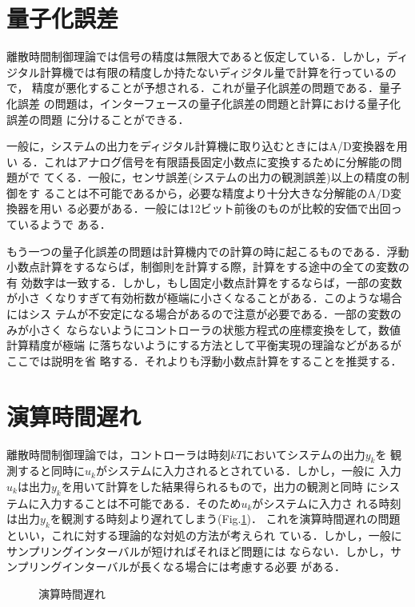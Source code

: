 \section{量子化誤差}
離散時間制御理論では信号の精度は無限大であると仮定している．しかし，ディ
ジタル計算機では有限の精度しか持たないディジタル量で計算を行っているので，
精度が悪化することが予想される．これが量子化誤差の問題である．量子化誤差
の問題は，インターフェースの量子化誤差の問題と計算における量子化誤差の問題
に分けることができる．

一般に，システムの出力をディジタル計算機に取り込むときにはA/D変換器を用い
る．これはアナログ信号を有限語長固定小数点に変換するために分解能の問題がで
てくる．一般に，センサ誤差(システムの出力の観測誤差)以上の精度の制御をす
ることは不可能であるから，必要な精度より十分大きな分解能のA/D変換器を用い
る必要がある．一般には12ビット前後のものが比較的安価で出回っているようで
ある．

もう一つの量子化誤差の問題は計算機内での計算の時に起こるものである．浮動
小数点計算をするならば，制御則を計算する際，計算をする途中の全ての変数の有
効数字は一致する．しかし，もし固定小数点計算をするならば，一部の変数が小さ
くなりすぎて有効桁数が極端に小さくなることがある．このような場合にはシス
テムが不安定になる場合があるので注意が必要である．一部の変数のみが小さく
ならないようにコントローラの状態方程式の座標変換をして，数値計算精度が極端
に落ちないようにする方法として平衡実現の理論などがあるがここでは説明を省
略する．それよりも浮動小数点計算をすることを推奨する．
\section{演算時間遅れ}
離散時間制御理論では，コントローラは時刻$kT$においてシステムの出力$y_k$を
観測すると同時に$u_k$がシステムに入力されるとされている．しかし，一般に
入力$u_k$は出力$y_k$を用いて計算をした結果得られるもので，出力の観測と同時
にシステムに入力することは不可能である．そのため$u_k$がシステムに入力さ
れる時刻は出力$y_k$を観測する時刻より遅れてしまう(Fig.\ref{fig_delay})．
これを演算時間遅れの問題といい，これに対する理論的な対処の方法が考えられ
ている．しかし，一般にサンプリングインターバルが短ければそれほど問題には
ならない．しかし，サンプリングインターバルが長くなる場合には考慮する必要
がある．

\begin{figure}[htbp]
 \begin{center}
 
  \caption{演算時間遅れ}
  \label{fig_delay}
 \end{center}
\end{figure}
